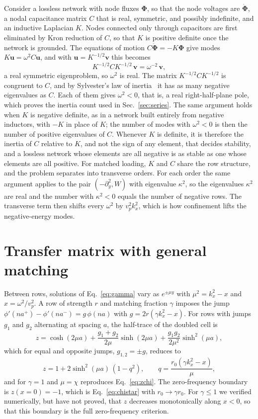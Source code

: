 \documentclass[aps,prapplied,twocolumn,superscriptaddress,floatfix,longbibliography]{revtex4-2}
\begin{document}
Consider a lossless network with node fluxes $\bm\Phi$, so that the node voltages are $\dot{\bm\Phi}$, a nodal capacitance matrix $C$ that is real, symmetric, and possibly indefinite, and an inductive Laplacian $K$. Nodes connected only through capacitors are first eliminated by Kron reduction of $C$, so that $K$ is positive definite once the network is grounded. The equations of motion $C\ddot{\bm\Phi}=-K\bm\Phi$ give modes $K\bm u=\omega^2C\bm u$, and with $\bm u=K^{-1/2}\bm v$ this becomes
\begin{equation}
K^{-1/2}CK^{-1/2}\,\bm v=\omega^{-2}\,\bm v,
\end{equation}
a real symmetric eigenproblem, so $\omega^2$ is real. The matrix $K^{-1/2}CK^{-1/2}$ is congruent to $C$, and by Sylvester's law of inertia~\cite{Horn_2013:book} it has as many negative eigenvalues as $C$. Each of them gives $\omega^2<0$, that is, a real right-half-plane pole, which proves the inertia count used in Sec.~\ref{sec:series}. The same argument holds when $K$ is negative definite, as in a network built entirely from negative inductors, with $-K$ in place of $K$; the number of modes with $\omega^2<0$ is then the number of positive eigenvalues of $C$. Whenever $K$ is definite, it is therefore the inertia of $C$ relative to $K$, and not the sign of any element, that decides stability, and a lossless network whose elements are all negative is as stable as one whose elements are all positive. For matched loading, $K$ and $C$ share the row structure, and the problem separates into transverse orders. For each order the same argument applies to the pair $(-\partial_y^2,W)$ with eigenvalue $\kappa^2$, so the eigenvalues $\kappa^2$ are real and the number with $\kappa^2<0$ equals the number of negative rows. The transverse term then shifts every $\omega^2$ by $v_p^2k_x^2$, which is how confinement lifts the negative-energy modes.

\section{Transfer matrix with general matching}
\label{app:gamma}

Between rows, solutions of Eq.~\eqref{eq:gamma} vary as $e^{\pm\mu y}$ with $\mu^2=k_x^2-x$ and $x=\omega^2/v_p^2$. A row of strength $r$ and matching fraction $\gamma$ imposes the jump $\phi'(na^+)-\phi'(na^-)=g\,\phi(na)$ with $g=2r(\gamma k_x^2-x)$. For rows with jumps $g_1$ and $g_2$ alternating at spacing $a$, the half-trace of the doubled cell is
\begin{equation}
z=\cosh(2\mu a)+\frac{g_1+g_2}{2\mu}\sinh(2\mu a)+\frac{g_1g_2}{2\mu^2}\sinh^2(\mu a),
\end{equation}
which for equal and opposite jumps, $g_{1,2}=\pm g$, reduces to
\begin{equation}
z=1+2\sinh^2(\mu a)\,(1-q^2),\qquad q=\frac{r_0(\gamma k_x^2-x)}{\mu},
\end{equation}
and for $\gamma=1$ and $\mu=\chi$ reproduces Eq.~\eqref{eq:zchi}. The zero-frequency boundary is $z(x=0)=-1$, which is Eq.~\eqref{eq:chistar} with $r_0\to\gamma r_0$. For $\gamma\le1$ we verified numerically, but have not proved, that $z$ decreases monotonically along $x<0$, so that this boundary is the full zero-frequency criterion.
\end{document}
